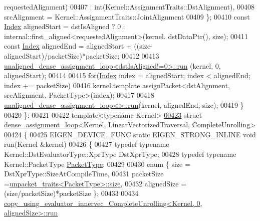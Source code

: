 \begin{DoxyCode}
      requestedAlignment)
00407                                                             : int(Kernel::AssignmentTraits::DstAlignment),
00408       srcAlignment = Kernel::AssignmentTraits::JointAlignment
00409     \};
00410     \textcolor{keyword}{const} \hyperlink{namespace_eigen_a62e77e0933482dafde8fe197d9a2cfde}{Index} alignedStart = dstIsAligned ? 0 : internal::first\_aligned<requestedAlignment>(kernel.
      dstDataPtr(), size);
00411     \textcolor{keyword}{const} \hyperlink{namespace_eigen_a62e77e0933482dafde8fe197d9a2cfde}{Index} alignedEnd = alignedStart + ((size-alignedStart)/packetSize)*packetSize;
00412 
00413     \hyperlink{struct_eigen_1_1internal_1_1unaligned__dense__assignment__loop}{unaligned\_dense\_assignment\_loop<dstIsAligned!=0>::run}
      (kernel, 0, alignedStart);
00414 
00415     \textcolor{keywordflow}{for}(\hyperlink{namespace_eigen_a62e77e0933482dafde8fe197d9a2cfde}{Index} index = alignedStart; index < alignedEnd; index += packetSize)
00416       kernel.template assignPacket<dstAlignment, srcAlignment, PacketType>(index);
00417 
00418     \hyperlink{struct_eigen_1_1internal_1_1unaligned__dense__assignment__loop}{unaligned\_dense\_assignment\_loop<>::run}(kernel, alignedEnd, size);
00419   \}
00420 \};
00421 
00422 \textcolor{keyword}{template}<\textcolor{keyword}{typename} Kernel>
\hyperlink{struct_eigen_1_1internal_1_1dense__assignment__loop_3_01_kernel_00_01_linear_vectorized_traversal_00_01_complete_unrolling_01_4}{00423} \textcolor{keyword}{struct }\hyperlink{struct_eigen_1_1internal_1_1dense__assignment__loop}{dense\_assignment\_loop}<Kernel, LinearVectorizedTraversal, CompleteUnrolling>
00424 \{
00425   EIGEN\_DEVICE\_FUNC \textcolor{keyword}{static} EIGEN\_STRONG\_INLINE \textcolor{keywordtype}{void} run(Kernel &kernel)
00426   \{
00427     \textcolor{keyword}{typedef} \textcolor{keyword}{typename} Kernel::DstEvaluatorType::XprType DstXprType;
00428     \textcolor{keyword}{typedef} \textcolor{keyword}{typename} Kernel::PacketType \hyperlink{struct_eigen_1_1_packet_type}{PacketType};
00429     
00430     \textcolor{keyword}{enum} \{ size = DstXprType::SizeAtCompileTime,
00431            packetSize =\hyperlink{struct_eigen_1_1internal_1_1unpacket__traits}{unpacket\_traits<PacketType>::size},
00432            alignedSize = (size/packetSize)*packetSize \};
00433 
00434     \hyperlink{struct_eigen_1_1internal_1_1copy__using__evaluator__innervec___complete_unrolling}{copy\_using\_evaluator\_innervec\_CompleteUnrolling<Kernel, 0, alignedSize>::run}

\end{DoxyCode}
